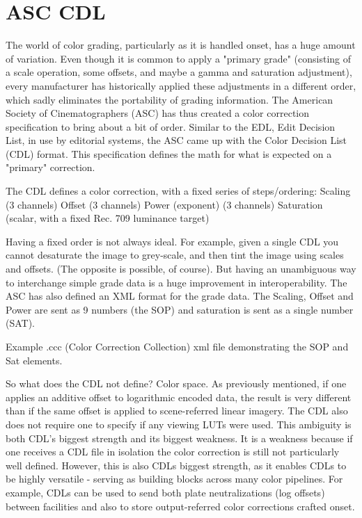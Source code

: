 \section{ASC CDL}%
\label{sec:asc-cdl}

The world of color grading, particularly as it is handled onset, has a huge amount of variation. Even though it is common to apply a "primary grade" (consisting of a scale operation, some offsets, and maybe a gamma and saturation adjustment), every manufacturer has historically applied these adjustments in a different order, which sadly eliminates the portability of grading information. The American Society of Cinematographers (ASC) has thus created a color correction specification to bring about a bit of order. Similar to the EDL, Edit Decision List, in use by editorial systems, the ASC came up with the Color Decision List (CDL) format. This specification defines the math for what is expected on a "primary" correction.

The CDL defines a color correction, with a fixed series of steps/ordering:
 Scaling (3 channels)
 Offset (3 channels)
 Power (exponent) (3 channels)
 Saturation (scalar, with a fixed Rec. 709 luminance target)

Having a fixed order is not always ideal. For example, given a single CDL you cannot desaturate the image to grey-scale, and then tint the image using scales and offsets. (The opposite is possible, of course). But having an unambiguous way to interchange simple grade data is a huge improvement in interoperability. The ASC has also defined an XML format for the grade data. The Scaling, Offset and Power are sent as 9 numbers (the SOP) and saturation is sent as a single number (SAT).


Example .ccc (Color Correction Collection) xml file demonstrating the SOP and Sat elements.

So what does the CDL not define? Color space. As previously mentioned, if one applies an additive offset to logarithmic encoded data, the result is very different than if the same offset is applied to scene-referred linear imagery. The CDL also does not require one to specify if any viewing LUTs were used. This ambiguity is both CDL's biggest strength and its biggest weakness. It is a weakness because if one receives a CDL file in isolation the color correction is still not particularly well defined. However, this is also CDLs biggest strength, as it enables CDLs to be highly versatile - serving as building blocks across many color pipelines. For example, CDLs can be used to send both plate neutralizations (log offsets) between facilities and also to store output-referred color corrections crafted onset.

